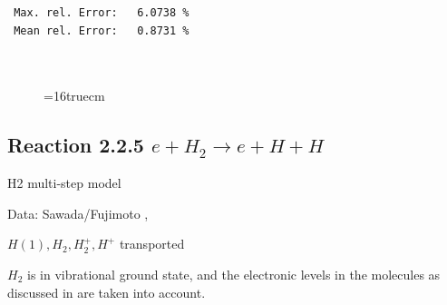 \documentclass[12pt,dvips]{article}
\begin{document}
\begin{small}
\begin{verbatim}
 Max. rel. Error:   6.0738 %
 Mean rel. Error:   0.8731 %



\end{verbatim}\end{small}
\begin{figure} \label{2.1.8b}
\epsfxsize=16truecm
\end{figure}
\newpage


\subsection{
Reaction 2.2.5    $e + H_2   \rightarrow e + H + H  $
}

H2 multi-step model

 Data: Sawada/Fujimoto ,\cite{kn:Sawada}

$  H(1), H_2, H_2^+, H^+ $ transported


$H_2$ is in vibrational ground state, and the electronic levels
in the molecules as discussed in \cite{kn:Sawada} are taken into
account.
\end{document}

